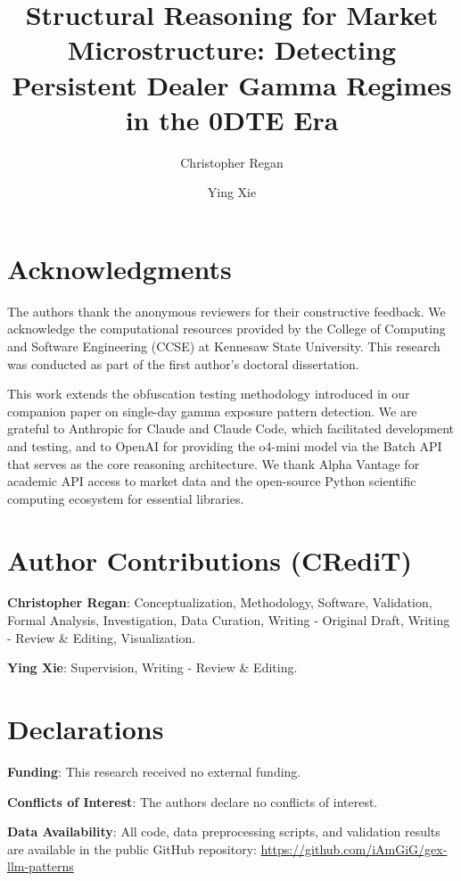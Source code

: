 \documentclass[preprint,12pt]{elsarticle}
\begin{document}
\begin{frontmatter}

\title{Structural Reasoning for Market Microstructure: Detecting Persistent Dealer Gamma Regimes in the 0DTE Era}

\author[ksu]{Christopher Regan}

\author[ksu]{Ying Xie}


\address[ksu]{College of Computing and Software Engineering, Kennesaw State University, Marietta, GA 30060, USA}

\end{frontmatter}

\section*{Acknowledgments}

The authors thank the anonymous reviewers for their constructive feedback. We acknowledge the computational resources provided by the College of Computing and Software Engineering (CCSE) at Kennesaw State University. This research was conducted as part of the first author's doctoral dissertation.

This work extends the obfuscation testing methodology introduced in our companion paper on single-day gamma exposure pattern detection. We are grateful to Anthropic for Claude and Claude Code, which facilitated development and testing, and to OpenAI for providing the o4-mini model via the Batch API that serves as the core reasoning architecture. We thank Alpha Vantage for academic API access to market data and the open-source Python scientific computing ecosystem for essential libraries.

\section*{Author Contributions (CRediT)}

\textbf{Christopher Regan}: Conceptualization, Methodology, Software, Validation, Formal Analysis, Investigation, Data Curation, Writing - Original Draft, Writing - Review \& Editing, Visualization.

\textbf{Ying Xie}: Supervision, Writing - Review \& Editing.

\section*{Declarations}

\textbf{Funding}: This research received no external funding.

\textbf{Conflicts of Interest}: The authors declare no conflicts of interest.

\textbf{Data Availability}: All code, data preprocessing scripts, and validation results are available in the public GitHub repository: \url{https://github.com/iAmGiG/gex-llm-patterns}
\end{document}
